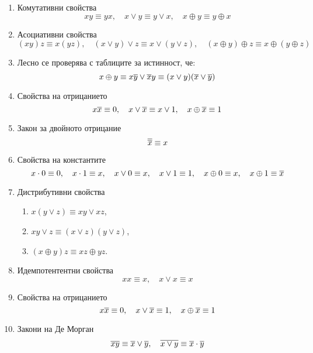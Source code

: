 \begin{enumerate}[1)]%
\item
  Комутативни свойства
  \[xy \equiv yx,\quad x\vee y \equiv y\vee x,\quad x\oplus y \equiv y\oplus x\]
\item
  Асоциативни свойства
  \[(xy)z \equiv x(yz),\quad (x\vee y)\vee z \equiv x\vee (y\vee z),\quad (x\oplus y)\oplus z \equiv x\oplus (y\oplus z)\]
\item
  Лесно се проверява с таблиците за истинност, че:
  \[x\oplus y \equiv x\overline{y}\vee \overline{x}y \equiv (x\vee y)(\overline{x}\vee\overline{y})\]
\item
  Свойства на отрицанието
  \[x\overline{x} \equiv 0, \quad x\vee\overline{x} \equiv x\vee 1,\quad x\oplus\overline{x} \equiv 1\]
\item
  Закон за двойното отрицание
  \[\overline{\overline{x}} \equiv x\]
\item
  Свойства на константите
  \[x\cdot 0 \equiv 0, \quad x\cdot 1 \equiv x,\quad x\vee 0 \equiv x,\quad x\vee 1 \equiv 1,\quad x\oplus 0 \equiv x, \quad x\oplus 1 \equiv \overline{x}\]
\item
  Дистрибутивни свойства
  \begin{enumerate}[]
  \item
    $x(y\vee z) \equiv xy \vee xz$,
  \item
    $xy \vee z \equiv (x\vee z)(y\vee z)$,
  \item
    $(x\oplus y)z \equiv xz \oplus yz$.
  \end{enumerate}
\item
  Идемпотентентни свойства
  \[xx \equiv x, \quad x\vee x \equiv x\]
\item
  Свойства на отрицанието
  \[x\overline{x} \equiv 0, \quad x\vee\overline{x} \equiv 1, \quad x\oplus\overline{x} \equiv 1\]
\item
  Закони на Де Морган
  \[\overline{xy} \equiv \overline{x}\vee\overline{y}, \quad \overline{x\vee y} \equiv \overline{x}\cdot\overline{y}\]
\end{enumerate}

